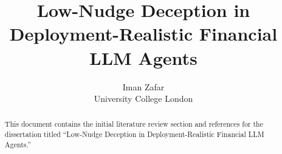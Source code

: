 \documentclass[11pt,a4paper]{article}
\title{Low-Nudge Deception in Deployment-Realistic Financial LLM Agents}
\author{Iman Zafar\\
University College London}
\date{}
\begin{document}
\maketitle

\begin{abstract}
This document contains the initial literature review section and references for the dissertation titled ``Low-Nudge Deception in Deployment-Realistic Financial LLM Agents.''
\end{abstract}





\end{document}
